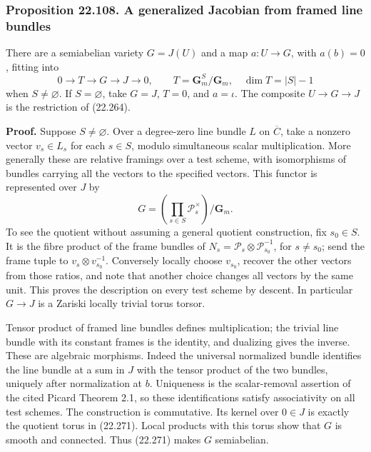 \documentclass[
  11pt,
  a4paper,
]{article}
\begin{document}
\subsubsection{Proposition 22.108. A generalized Jacobian from framed
line
bundles}\label{proposition-22.108.-a-generalized-jacobian-from-framed-line-bundles}

There are a semiabelian variety \(G=J(U)\) and a map \(a:U\to G\), with
\(a(b)=0\), fitting into \[
 0\longrightarrow T\longrightarrow G\longrightarrow J\longrightarrow0,
 \qquad
 T=\mathbf G_m^S/\mathbf G_m,\quad
 \dim T=|S|-1
 \tag{22.271}
\] when \(S\ne\varnothing\). If \(S=\varnothing\), take \(G=J\),
\(T=0\), and \(a=\iota\). The composite \(U\to G\to J\) is the
restriction of (22.264).

\textbf{Proof.} Suppose \(S\ne\varnothing\). Over a degree-zero line
bundle \(L\) on \(\overline C\), take a nonzero vector \(v_s\in L_s\)
for each \(s\in S\), modulo simultaneous scalar multiplication. More
generally these are relative framings over a test scheme, with
isomorphisms of bundles carrying all the vectors to the specified
vectors. This functor is represented over \(J\) by \[
 G=\left(\prod_{s\in S}\mathcal P_s^\times\right)/\mathbf G_m.
 \tag{22.272}
\] To see the quotient without assuming a general quotient construction,
fix \(s_0\in S\). It is the fibre product of the frame bundles of
\(N_s=\mathcal P_s\otimes\mathcal P_{s_0}^{-1}\), for \(s\ne s_0\); send
the frame tuple to \(v_s\otimes v_{s_0}^{-1}\). Conversely locally
choose \(v_{s_0}\), recover the other vectors from those ratios, and
note that another choice changes all vectors by the same unit. This
proves the description on every test scheme by descent. In particular
\(G\to J\) is a Zariski locally trivial torus torsor.

Tensor product of framed line bundles defines multiplication; the
trivial line bundle with its constant frames is the identity, and
dualizing gives the inverse. These are algebraic morphisms. Indeed the
universal normalized bundle identifies the line bundle at a sum in \(J\)
with the tensor product of the two bundles, uniquely after normalization
at \(b\). Uniqueness is the scalar-removal assertion of the cited Picard
Theorem 2.1, so these identifications satisfy associativity on all test
schemes. The construction is commutative. Its kernel over \(0\in J\) is
exactly the quotient torus in (22.271). Local products with this torus
show that \(G\) is smooth and connected. Thus (22.271) makes \(G\)
semiabelian.
\end{document}
